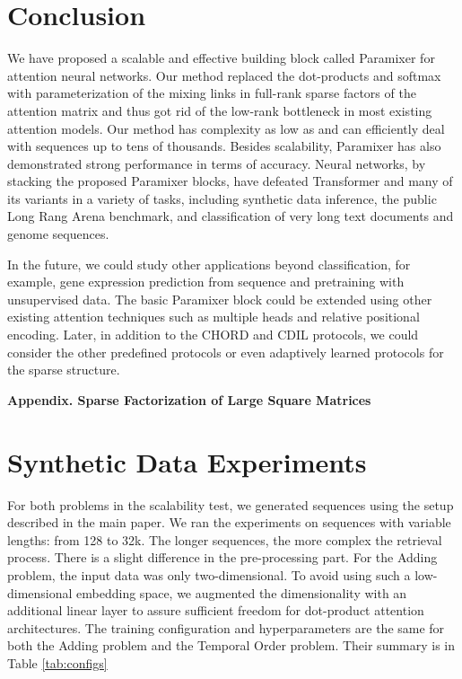 \documentclass{article}
\begin{document}
\section{Conclusion}
\label{sec:conclusion}
We have proposed a scalable and effective building block called Paramixer for attention neural networks. Our method replaced the dot-products and softmax with parameterization of the mixing links in full-rank sparse factors of the attention matrix and thus got rid of the low-rank bottleneck in most existing attention models. Our method has complexity as low as  and can efficiently deal with sequences up to tens of thousands. Besides scalability, Paramixer has also demonstrated strong performance in terms of accuracy. Neural networks, by stacking the proposed Paramixer blocks, have defeated Transformer and many of its variants in a variety of tasks, including synthetic data inference, the public Long Rang Arena benchmark, and classification of very long text documents and genome sequences.

In the future, we could study other applications beyond classification, for example, gene expression prediction from sequence and pretraining with unsupervised data. The basic Paramixer block could be extended using other existing attention techniques such as multiple heads and relative positional encoding. Later, in addition to the CHORD and CDIL protocols, we could consider the other predefined protocols or even adaptively learned protocols for the sparse structure.

  
  



\clearpage
\begin{center}
\textbf{\large Appendix. Sparse Factorization of Large Square Matrices}
\end{center}
\setcounter{equation}{0}
\setcounter{figure}{0}
\setcounter{table}{0}
\setcounter{page}{1}
\setcounter{section}{0}
\makeatletter
\renewcommand{\theequation}{A\arabic{equation}}
\renewcommand{\thefigure}{A\arabic{figure}}
\renewcommand{\thetable}{A\arabic{table}}



\section{Synthetic Data Experiments}
For both problems in the scalability test, we generated sequences using the setup described in the main paper. We ran the experiments on sequences with variable lengths: from 128 to 32k. The longer sequences, the more complex the retrieval process. There is a slight difference in the pre-processing part. For the Adding problem, the input data was only two-dimensional. To avoid using such a low-dimensional embedding space, we augmented the dimensionality with an additional linear layer to assure sufficient freedom for dot-product attention architectures. The training configuration and hyperparameters are the same for both the Adding problem and the Temporal Order problem. Their summary is in Table \ref{tab:configs}
\end{document}
